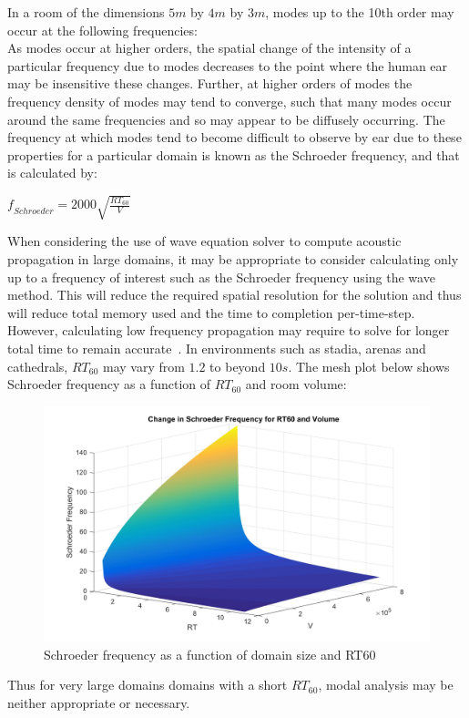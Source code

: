 In a room of the dimensions $5m$ by $4m$ by $3m$, modes up to the 10th order may occur at the following frequencies:\\

As modes occur at higher orders, the spatial change of the intensity of a particular frequency due to modes decreases to the point where the human ear may be insensitive these changes. Further, at higher orders of modes the frequency density of modes may tend to converge, such that many modes occur around the same frequencies and so may appear to be diffusely occurring. The frequency at which modes tend to become difficult to observe by ear due to these properties for a particular domain is known as the Schroeder frequency, and that is calculated by:\\

\begin{center}
$ \textit{f}_{Schroeder} = 2000 \sqrt{\frac{RT_{60}}{V}} $\\
\end{center}

When considering the use of wave equation solver to compute acoustic propagation in large domains, it may be appropriate to consider calculating only up to a frequency of interest such as the Schroeder frequency using the wave method. This will reduce the required spatial resolution for the solution and thus will reduce total memory used and the time to completion per-time-step. However, calculating low frequency propagation may require to solve for longer total time to remain accurate~\cite{Bilbao2004a}. In environments such as stadia, arenas and cathedrals, $RT_{60}$ may vary from $1.2$ to beyond $10s$. The mesh plot below shows Schroeder frequency as a function of $RT_{60}$ and room volume: \\

\begin{figure}[H]
\centering
  \includegraphics[width=\textwidth]{./graphics/SchroederForRTandV.jpg}
  \caption{Schroeder frequency as a function of domain size and RT60}
\end{figure}

Thus for very large domains domains with a short $RT_{60}$, modal analysis may be neither appropriate or necessary.